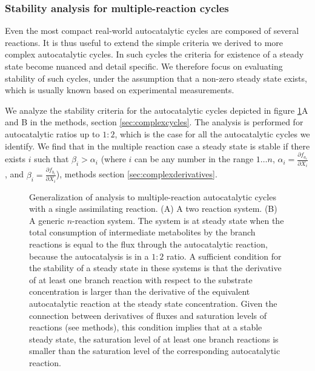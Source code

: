    \subsubsection{Stability analysis for multiple-reaction cycles}
   Even the most compact real-world autocatalytic cycles are composed of several reactions.
    It is thus useful to extend the simple criteria we derived to more complex autocatalytic cycles.
    In such cycles the criteria for existence of a steady state become nuanced and detail specific.
    We therefore focus on evaluating stability of such cycles, under the assumption that a non-zero steady state exists, which is usually known based on experimental measurements.

    We analyze the stability criteria for the autocatalytic cycles depicted in figure \ref{fig:multiple}A and B in the methods, section \ref{sec:complexcycles}.
    The analysis is performed for autocatalytic ratios up to $1\mathbin{:}2$, which is the case for all the autocatalytic cycles we identify.
    We find that in the multiple reaction case a steady state is stable if there exists $i$ such that $\beta_i > \alpha_i$ (where $i$ can be any number in the range $1\dots n$, $\alpha_i=\frac{\partial f_{a_i}}{\partial X_i}$, and $\beta_i=\frac{\partial f_{b_i}}{\partial X_i}$), methods section \ref{sec:complexderivatives}.

\begin{figure}[!htb]
\iftoggle{elifesubmission} { }
{
  \centering
      
  }
     \caption{
     Generalization of analysis to multiple-reaction autocatalytic cycles with a single assimilating reaction.
     (A) A two reaction system.
     (B) A generic $n$-reaction system.
     The system is at steady state when the total consumption of intermediate metabolites by the branch reactions is equal to the flux through the autocatalytic reaction, because the autocatalysis is in a $1\mathbin{:}2$ ratio.
     A sufficient condition for the stability of a steady state in these systems is that the derivative of at least one branch reaction with respect to the substrate concentration is larger than the derivative of the equivalent autocatalytic reaction at the steady state concentration.
     Given the connection between derivatives of fluxes and saturation levels of reactions (see methods), this condition implies that at a stable steady state, the saturation level of at least one branch reactions is smaller than the saturation level of the corresponding autocatalytic reaction.
 }
     \label{fig:multiple}
\end{figure}


